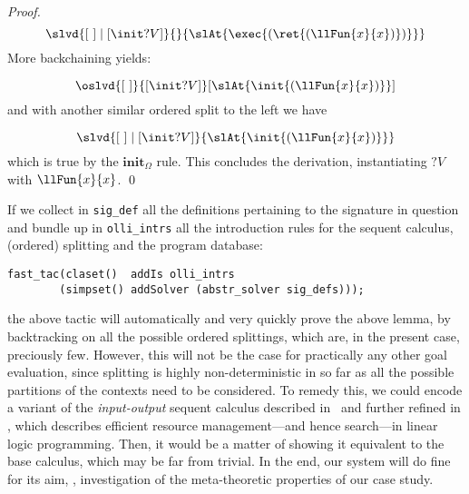 \documentclass[final]{svjour3}
\begin{document}
\begin{proof}
 $$\slvd {\elist\coln[\init ?V]}{} {\slAt{\exec {(\ret
       {(\llFun{x}{x})})}}}$$
More backchaining yields:

  $$\oslvd {\elist}{[\init ?V]} [{\slAt{\init {(\llFun{x}{x})}}}]$$
and with another similar ordered split to the left we have

  $$\slvd {\elist\coln[\init ?V]} {\slAt{\init {(\llFun{x}{x})}}}$$
which is true by the $\mathbf{init}_\Omega$ rule. This concludes the
derivation, instantiating $?V$ with $\llFun{x}{x}$.
\qed\end{proof}



If we collect in \texttt{sig\_def} all the definitions pertaining to
the signature in question and bundle up in \texttt{olli\_intrs} all
the introduction rules for the sequent calculus, (ordered) splitting
and the program database:
\begin{verbatim}
fast_tac(claset()  addIs olli_intrs
        (simpset() addSolver (abstr_solver sig_defs)));
\end{verbatim}
the above tactic will automatically and very quickly prove the above lemma,
by backtracking on all the possible ordered splittings, which are, in
the present case, preciously few.  However, this will not be the case
for practically any other goal evaluation, since splitting is highly
non-deterministic in so far as all the possible partitions of the
contexts need to be considered. To remedy this, we could encode a
variant of the \emph{input-output} sequent calculus described
in~\cite{Polakow01phd} and further refined in \cite{Polakow06}, which
describes efficient resource management---and hence search---in
linear logic programming.  Then, it would be a matter of showing it
equivalent to the base calculus, which may be far from
trivial. In the end, our system will do fine for its aim, \ie,
investigation of the meta-theoretic properties of our case study.
\end{document}
